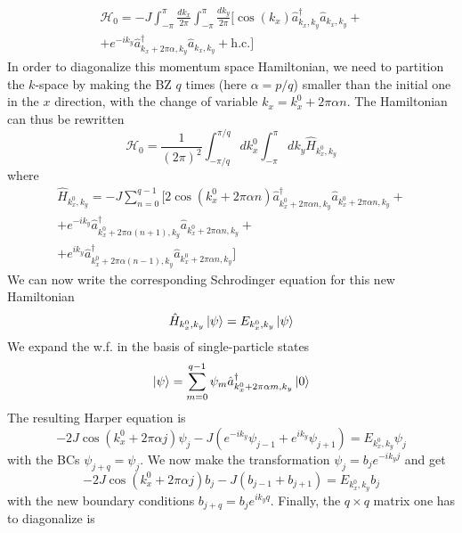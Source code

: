 \documentclass[a4paper,prb,10pt,aps,twocolumn]{revtex4-1}
\begin{document}
\begin{multline}
  \label{eq:19}
  \mathcal{H}_0= -J\int_{-\pi}^{\pi} \frac{dk_x}{2\pi}\int_{-\pi}^{\pi} \frac{dk_y}{2\pi} [\cos(k_x)\hat{a}^{\dagger}_{k_x,k_y} \hat{a}_{k_x,k_y} +\\
+ e^{-ik_y}\hat{a}^{\dagger}_{k_x+2\pi\alpha,k_y}\hat{a}_{k_x,k_y} + \text{h.c.}]
\end{multline}
In order to diagonalize this momentum space Hamiltonian, we need to partition the $k$-space by making the BZ $q$ times (here $\alpha = p/q$) smaller than the initial one in the $x$ direction, with the change of variable $k_x = k_x^0 + 2\pi\alpha n$. The Hamiltonian can thus be rewritten
\begin{equation}
  \label{eq:20}
  \mathcal{H}_0 = \frac{1}{(2\pi)^2} \int_{-\pi/q}^{\pi/q} dk_x^0 \int_{-\pi}^{\pi} dk_y \hat{H}_{k_x^0, k_y}
\end{equation}
where
\begin{multline}
  \label{eq:21}
  \hat{H}_{k_x^0, k_y} = -J\sum_{n=0}^{q-1} [2 \cos(k_x^0 + 2\pi \alpha n) \hat{a}^{\dagger}_{k_x^0+2\pi\alpha n, k_y} \hat{a}_{k_x^0+2\pi \alpha n, k_y}+\\
+ e^{-i k_y} \hat{a}^{\dagger}_{k_x^0 + 2\pi\alpha(n+1), k_y} \hat{a}_{k_x^0 + 2\pi\alpha n, k_y} +\\
+ e^{i k_y} \hat{a}^{\dagger}_{k_x^0 + 2\pi\alpha(n-1), k_y} \hat{a}_{k_x^0 + 2\pi\alpha n, k_y}]
\end{multline}
We can now write the corresponding Schrodinger equation for this new Hamiltonian 
\begin{equation}
  \label{eq:23}
  \hat{H}_{k_x^0, k_y} \ket{\psi} = E_{k_x^0, k_y} \ket{\psi}
\end{equation}
We expand the w.f. in the basis of single-particle states
\begin{equation}
  \label{eq:24}
  \ket{\psi} = \sum_{m=0}^{q-1} \psi_m \hat{a}^{\dagger}_{k_x^0 + 2\pi\alpha m, k_y} \ket{0}
\end{equation}
The resulting Harper equation is
\begin{equation}
  \label{eq:25}
  -2J\cos(k_x^0 + 2\pi \alpha j) \psi_j - J (e^{-ik_y} \psi_{j-1} + e^{i k_y} \psi_{j+1}) = E_{k_x^0, k_y} \psi_j
\end{equation}
with the BCs $\psi_{j+q} = \psi_j$. We now make the transformation $\psi_j = b_j e^{-i k_y j}$ and get
\begin{equation}
  \label{eq:26}
  -2J\cos(k_x^0 + 2\pi \alpha j) b_j - J (b_{j-1} + b_{j+1}) = E_{k_x^0, k_y} b_j
\end{equation}
with the new boundary conditions $b_{j+q} = b_j e^{i k_y q}$. Finally, the $q \times q$ matrix one has to diagonalize is
\end{document}
